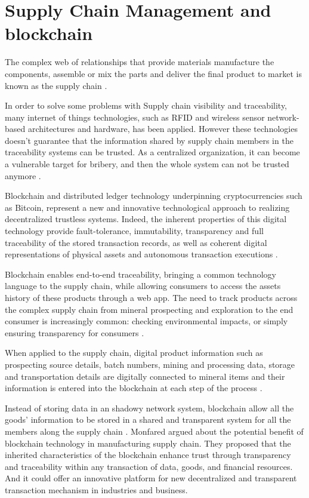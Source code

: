 \section{Supply Chain Management and blockchain}\label{sec:scm}

The complex web of relationships that provide materials manufacture the components, assemble or mix the parts and deliver the final product to market is known as the supply chain \cite{buurman2002supply}.

In order to solve some problems with Supply chain visibility and traceability, many internet of things technologies, such as RFID and wireless sensor network-based architectures and hardware, has been applied. However these technologies doesn't guarantee that the information shared by supply chain members in the traceability systems can be trusted. As a centralized organization, it can become a vulnerable target for bribery, and then the whole system can not be trusted anymore \cite{tian2017supply}.

Blockchain and distributed ledger technology underpinning cryptocurrencies such as Bitcoin, represent a new and innovative technological approach to realizing decentralized trustless systems. Indeed, the inherent properties of this digital technology provide fault-tolerance, immutability, transparency and full traceability of the stored transaction records, as well as coherent digital representations of physical assets and autonomous transaction executions \cite{caro2018blockchain}.

Blockchain enables end-to-end traceability, bringing a common technology language to the supply chain, while allowing consumers to access the assets history of these products through a web app. The need to track products across the complex supply chain from mineral prospecting and exploration to the end consumer is increasingly common: checking environmental impacts, or simply ensuring transparency for consumers \cite{galvez2018future}.

When applied to the supply chain, digital product information such as prospecting source details, batch numbers, mining and processing data, storage and transportation details are digitally connected to mineral items and their information is entered into the blockchain at each step of the process \cite{caro2018blockchain}.

Instead of storing data in an shadowy network system, blockchain allow all the goods' information to be stored in a shared and transparent system for all the members along the supply chain \cite{tian2017supply}. Monfared \cite{abeyratne2016blockchain} argued about the potential benefit of blockchain technology in manufacturing supply chain. They proposed that the inherited characteristics of the blockchain enhance trust through transparency and traceability within any transaction of data, goods, and financial resources. And it could offer an innovative platform for new decentralized and transparent transaction mechanism in industries and business.

